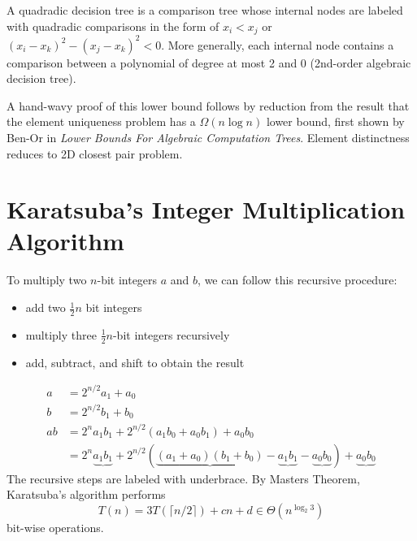 A quadradic decision tree is a comparison tree whose internal nodes are labeled with quadradic comparisons in the form of $x_i < x_j$ or $(x_i - x_k)^2 - (x_j - x_k)^2 < 0$. More generally, each internal node contains a comparison between a polynomial of degree at most 2 and 0 (2nd-order algebraic decision tree).

A hand-wavy proof of this lower bound follows by reduction from the result that the element uniqueness problem has a $\Omega(n \log n)$ lower bound, first shown by Ben-Or in \textit{Lower Bounds For Algebraic Computation Trees}. Element distinctness reduces to 2D closest pair problem.

\section{Karatsuba's Integer Multiplication Algorithm} 

To multiply two $n$-bit integers $a$ and $b$, we can follow this recursive procedure:
\begin{itemize}
    \item add two $\frac{1}{2}n$ bit integers
    \item multiply three $\frac{1}{2}n$-bit integers recursively
    \item add, subtract, and shift to obtain the result
\end{itemize}

$$
\begin{aligned}
    a &= 2^{n/2} a_1 + a_0 \\
    b &= 2^{n/2} b_1 + b_0 \\
    ab &= 2^n a_1b_1 + 2^{n/2} (a_1b_0 + a_0b_1) + a_0b_0 \\
    &= 2^n \underbrace{a_1b_1} + 2^{n/2} (\underbrace{(a_1+a_0)(b_1+b_0)} - \underbrace{a_1b_1} - \underbrace{a_0b_0}) + \underbrace{a_0b_0}
\end{aligned}
$$
The recursive steps are labeled with underbrace. By Masters Theorem, Karatsuba's algorithm performs
$$
T(n)=3T(\lceil n/2\rceil )+cn+d \in \Theta(n^{\log_2 3})
$$
bit-wise operations.